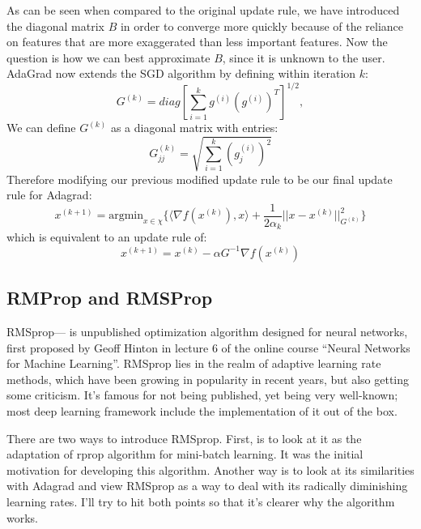 As can be seen when compared to the original update rule, we have introduced the diagonal matrix
$B$ in order to converge more quickly because of the reliance on features that are
more exaggerated than less important features.
Now the question is how we can best approximate $B$, since it is unknown to the user.
AdaGrad now extends the SGD algorithm by defining within iteration $k$:
\begin{equation}
	\label{equ:adagrad_extension}
	G^{(k)} = diag[\sum_{i=1}^{k}g^{(i)}(g^{(i)})^{T}]^{1/2},
\end{equation}
We can define $G^{(k)}$ as a diagonal matrix with entries:
\begin{equation}
	\label{equ:adagrad_matrix}
	G^{(k)}_{jj} = \sqrt{\sum_{i=1}^{k} (g_j^{(i)})^2}
\end{equation}
Therefore modifying our previous modified update rule to be our final update rule for Adagrad:
\begin{equation}
	\label{equ:adagrad_opt}
	x^{(k+1)} = \text{argmin}_{x \in \chi} \{ \langle \nabla f(x^{(k)}), x \rangle + 
	\frac{1}{2 \alpha_k} \lvert \lvert x - x^{(k)} \rvert \rvert_{G^{(k)}}^2 \}
\end{equation}
which is equivalent to an update rule of:
\begin{equation}
	\label{equ:adagrad_opt_equiv}
	x^{(k+1)} = x^{(k)} - \alpha G^{-1} \nabla f(x^{(k)})
\end{equation}

\subsection{RMProp and RMSProp}
\FloatBarrier
RMSprop— is unpublished optimization algorithm designed for neural networks, first proposed by
Geoff Hinton in lecture 6 of the online course “Neural Networks for Machine Learning”.
RMSprop lies in the realm of adaptive learning rate methods, which have been growing in
popularity in recent years, but also getting some criticism. 
It’s famous for not being published, yet being very well-known; most deep learning framework 
include the implementation of it out of the box.

There are two ways to introduce RMSprop. First, is to look at it as the adaptation of rprop
algorithm for mini-batch learning. 
It was the initial motivation for developing this algorithm. Another way is to look at its 
similarities with Adagrad and view RMSprop as a way to deal with its radically diminishing
learning rates.
I’ll try to hit both points so that it’s clearer why the algorithm works.

